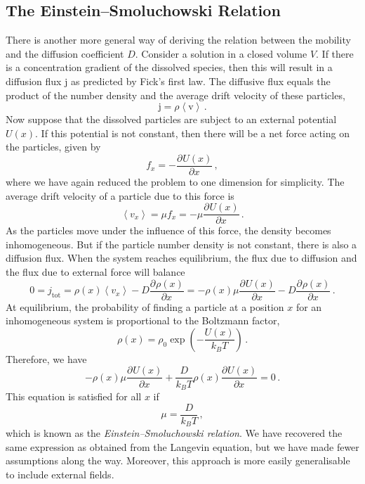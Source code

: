 \documentclass{article}
\theoremstyle{plain}\theoremheaderfont{\normalfont\bfseries}\theorembodyfont{\rmfamily}\theoremseparator{.}\newtheorem*{thm}{Theorem}\newtheorem*{law}{Law}\newtheorem*{pos}{Postulate}
\numberwithin{equation}{section}
\newcommand{\pdv}[3][]{\frac{\partial^{#1} #2}{{\partial #3}^{#1}}}
\newcommand{\eval}[1]{\left\langle #1 \right\rangle}
\newcommand{\vb}[1]{\bm{\mathrm{#1}}}
\begin{document}
    \subsection{The Einstein--Smoluchowski Relation}\label{Chap:Einstein_Smoluchowski}
    There is another more general way of deriving the relation between the mobility and the diffusion coefficient \(D\). Consider a solution in a closed volume \(V\). If there is a concentration gradient of the dissolved species, then this will result in a diffusion flux \(\vb{j}\) as predicted by Fick's first law. The diffusive flux equals the product of the number density and the average drift velocity of these particles,
    \begin{equation}
        \vb{j}=\rho\eval{\vb{v}}\,.
    \end{equation}
    Now suppose that the dissolved particles are subject to an external potential \(U(x)\). If this potential is not constant, then there will be a net force acting on the particles, given by
    \begin{equation}
        f_x=-\pdv{U(x)}{x}\,,
    \end{equation}
    where we have again reduced the problem to one dimension for simplicity. The average drift velocity of a particle due to this force is
    \begin{equation}
        \eval{v_x}=\mu f_x=-\mu\pdv{U(x)}{x}\,.
    \end{equation}
    As the particles move under the influence of this force, the density becomes inhomogeneous. But if the particle number density is not constant, there is also a diffusion flux. When the system reaches equilibrium, the flux due to diffusion and the flux due to external force will balance
    \begin{equation}
        0=j_{\text{tot}}=\rho(x)\eval{v_x}-D\pdv{\rho(x)}{x}=-\rho(x)\mu\pdv{U(x)}{x}-D\pdv{\rho(x)}{x}\,.
    \end{equation}
    At equilibrium, the probability of finding a particle at a position \(x\) for an inhomogeneous system is proportional to the Boltzmann factor,
    \begin{equation}
        \rho(x)=\rho_0\exp\left(-\frac{U(x)}{k_B T}\right)\,.
    \end{equation}
    Therefore, we have
    \begin{equation}
        -\rho(x)\mu\pdv{U(x)}{x}+\frac{D}{k_B T}\rho(x)\pdv{U(x)}{x}=0\,.
    \end{equation}
    This equation is satisfied for all \(x\) if
    \begin{equation}
        \mu=\frac{D}{k_B T}\,,
    \end{equation}
    which is known as the \textit{Einstein--Smoluchowski relation}. We have recovered the same expression as obtained from the Langevin equation, but we have made fewer assumptions along the way. Moreover, this approach is more easily generalisable to include external fields.
\end{document}
